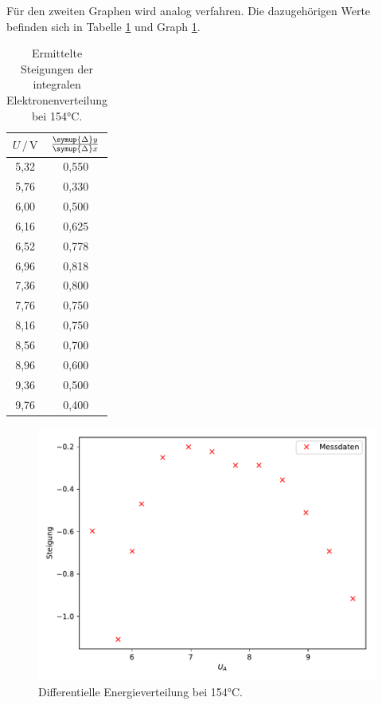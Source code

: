 Für den zweiten Graphen wird analog verfahren. Die dazugehörigen Werte befinden sich in Tabelle \ref{tab:154}
und Graph \ref{fig:plot2}.

\begin{table}
  \centering
  \caption{Ermittelte Steigungen der integralen Elektronenverteilung bei 154°C.}
  \label{tab:154}
  \begin{tabular}{c c }
  \toprule
  $ U \,/\, \si{\volt} $ & $\frac{\symup{\Delta}y}{\symup{\Delta}x}$\\
  \midrule 
  5,32 & 0,550\\
  5,76 & 0,330\\
  6,00 & 0,500\\
  6,16 & 0,625\\
  6,52 & 0,778\\
  6,96 & 0,818\\
  7,36 & 0,800\\
  7,76 & 0,750\\
  8,16 & 0,750\\
  8,56 & 0,700\\
  8,96 & 0,600\\
  9,36 & 0,500\\
  9,76 & 0,400\\
  \bottomrule
  \end{tabular}
  \end{table}

\begin{figure}
  \centering
  \includegraphics{content/plot2.pdf}
  \caption{Differentielle Energieverteilung bei 154°C.}
  \label{fig:plot2}
\end{figure}

